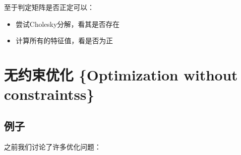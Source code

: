 \documentclass[
]{book}
\providecommand{\tightlist}{%
  \setlength{\itemsep}{0pt}\setlength{\parskip}{0pt}}
\begin{document}
至于判定矩阵是否正定可以：

\begin{itemize}
\tightlist
\item
  尝试Cholesky分解，看其是否存在
\item
  计算所有的特征值，看是否为正
\end{itemize}

\hypertarget{ux65e0ux7ea6ux675fux4f18ux5316-optimization-without-constraintss}{%
\chapter{无约束优化 \{Optimization without constraintss\}}\label{ux65e0ux7ea6ux675fux4f18ux5316-optimization-without-constraintss}}

\hypertarget{ux4f8bux5b50-1}{%
\section{例子}\label{ux4f8bux5b50-1}}

之前我们讨论了许多优化问题：
\end{document}
